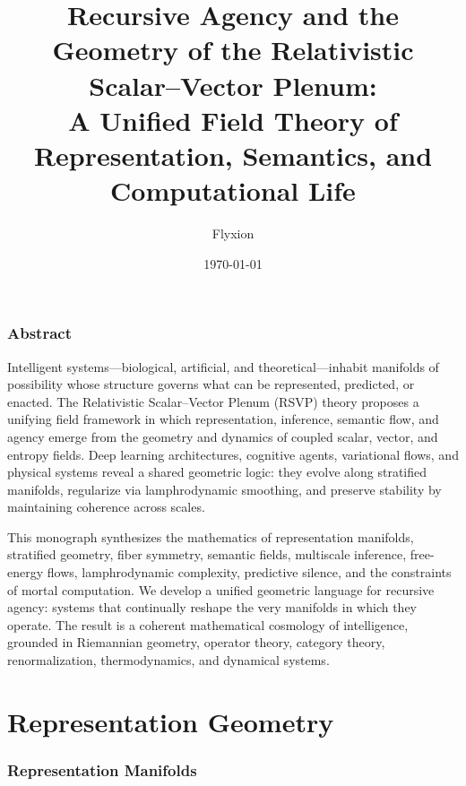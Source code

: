 \documentclass[12pt]{article}
\title{\Large\bfseries
Recursive Agency and the Geometry of the Relativistic Scalar--Vector Plenum:\\
A Unified Field Theory of Representation, Semantics, and Computational Life
}
\author{Flyxion}
\date{\today}
\theoremstyle{plain}
\theoremstyle{definition}
\theoremstyle{remark}
\begin{document}
\maketitle
\tableofcontents
\newpage

\section*{Abstract}

Intelligent systems---biological, artificial, and theoretical---inhabit 
manifolds of possibility whose structure governs what can be represented, 
predicted, or enacted. The Relativistic Scalar--Vector Plenum (RSVP) theory
proposes a unifying field framework in which representation, inference, 
semantic flow, and agency emerge from the geometry and dynamics of coupled 
scalar, vector, and entropy fields. Deep learning architectures, cognitive 
agents, variational flows, and physical systems reveal a shared geometric 
logic: they evolve along stratified manifolds, regularize via lamphrodynamic 
smoothing, and preserve stability by maintaining coherence across scales. 

This monograph synthesizes the mathematics of representation manifolds, 
stratified geometry, fiber symmetry, semantic fields, multiscale inference, 
free-energy flows, lamphrodynamic complexity, predictive silence, and the 
constraints of mortal computation. We develop a unified geometric language 
for recursive agency: systems that continually reshape the very manifolds 
in which they operate. The result is a coherent mathematical cosmology of 
intelligence, grounded in Riemannian geometry, operator theory, category 
theory, renormalization, thermodynamics, and dynamical systems.

\newpage

\part{Representation Geometry}

\section{Representation Manifolds}
\end{document}
